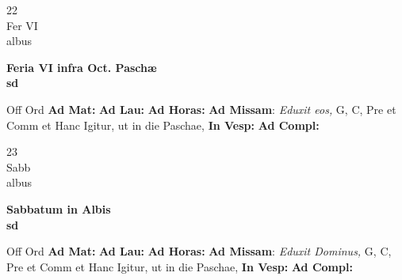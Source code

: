 \documentclass[10pt, openany]{book}
\begin{document}
        \begin{center}
            \begin{minipage}{3.5in}
                \vspace{2em}
                \begin{minipage}{0.5in}
                    {\Huge 22} \\
                    {\normalsize Fer VI} \\
                    {\normalsize albus}
                \end{minipage}
                \begin{minipage}{3.0in}
                    \textbf{ \large Feria VI infra Oct. Paschæ \\
                    \textnormal{\normalsize sd}} \\ 
                \end{minipage}
                \begin{justify}Off Ord
                    \textbf{Ad Mat: }
                    \textbf{Ad Lau: }
                    \textbf{Ad Horas: }\textbf{Ad Missam}: \textit{Eduxit eos,} G, C, Pre et Comm et Hanc Igitur, ut in die Paschae,  
                    \textbf{In Vesp: }
                    \textbf{Ad Compl: }
                \end{justify}
            \end{minipage}
        \end{center}
    
        \begin{center}
            \begin{minipage}{3.5in}
                \vspace{2em}
                \begin{minipage}{0.5in}
                    {\Huge 23} \\
                    {\normalsize Sabb} \\
                    {\normalsize albus}
                \end{minipage}
                \begin{minipage}{3.0in}
                    \textbf{ \large Sabbatum in Albis \\
                    \textnormal{\normalsize sd}} \\ 
                \end{minipage}
                \begin{justify}Off Ord
                    \textbf{Ad Mat: }
                    \textbf{Ad Lau: }
                    \textbf{Ad Horas: }\textbf{Ad Missam}: \textit{Eduxit Dominus,} G, C, Pre et Comm et Hanc Igitur, ut in die Paschae,  
                    \textbf{In Vesp: }
                    \textbf{Ad Compl: }
                \end{justify}
            \end{minipage}
        \end{center}
    
\end{document}
